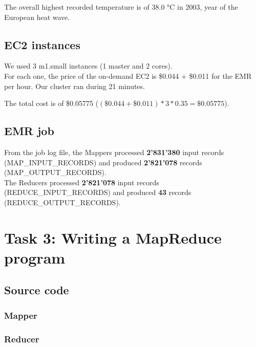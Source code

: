 \documentclass[a4paper]{article}
\begin{document}
	The overall highest recorded temperature is of 38.0 °C in 2003, year of the European heat wave.

	\subsection{EC2 instances}
	We used 3 m1.small instances (1 master and 2 cores). \\
	For each one, the price of the on-demand EC2 is \$0.044 + \$0.011 for the EMR per hour.
	Our cluster ran during 21 minutes.
	
	The total cost is of \$0.05775 ($(\$0.044+\$0.011)*3*0.35 = \$0.05775$).
	
	\subsection{EMR job}
	From the job log file, the Mappers processed \textbf{2'831'380} input records (MAP\_INPUT\_RECORDS) and produced \textbf{2'821'078} records (MAP\_OUTPUT\_RECORDS). \\
	The Reducers processed \textbf{2'821'078} input records (REDUCE\_INPUT\_RECORDS) and produced \textbf{43} records (REDUCE\_OUTPUT\_RECORDS).

	\pagebreak

	\section{Task 3: Writing a MapReduce program}

	\subsection{Source code}

	\subsubsection{Mapper}
	

	\subsubsection{Reducer}
	
\end{document}

